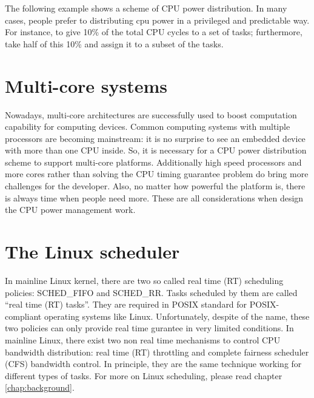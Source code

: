 The following example shows a scheme of CPU power distribution.
In many cases, people prefer to distributing cpu power in a privileged and 
predictable way. For instance, to give 10\% of the total CPU cycles to a 
set of tasks; furthermore, take half of this 10\% and assign it to a 
subset of the tasks.
\section{Multi-core systems}

Nowadays, multi-core architectures are successfully used to boost
computation capability for computing devices. Common computing systems
with multiple processors are becoming mainstream: it is no surprise to
see an embedded device with more than one CPU inside. So, it is 
necessary for a CPU power distribution scheme to support multi-core 
platforms. Additionally high speed processors and more cores rather 
than solving the CPU timing guarantee problem do bring more challenges 
for the developer. Also, no matter how powerful the platform is, there 
is always time when people need more. These are all considerations 
when design the CPU power management work.
%


\section{The Linux scheduler}

%
In mainline Linux kernel, there are two so called real time (RT)
scheduling policies: SCHED\_FIFO and SCHED\_RR. Tasks scheduled by 
them are called ``real time (RT) tasks''. They are required in POSIX 
standard for POSIX-compliant operating systems like Linux. 
Unfortunately, despite of the name, these two policies can only 
provide real time gurantee in very limited conditions. In mainline 
Linux, there exist two non real time mechanisms to control CPU 
bandwidth distribution: real time (RT) throttling and complete 
fairness scheduler (CFS) bandwidth control. In principle, they 
are the same technique working for different types of tasks. 
For more on Linux scheduling, please read chapter 
\ref{chap:background}.


